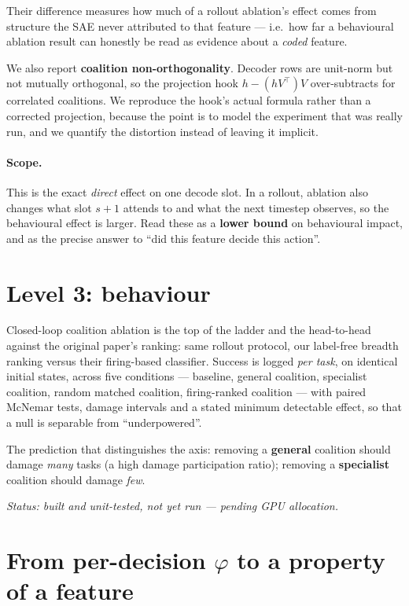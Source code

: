 \documentclass[11pt]{article}
\begin{document}
\noindent
Their difference measures how much of a rollout ablation's effect comes from structure the SAE
never attributed to that feature --- i.e.\ how far a behavioural ablation result can honestly
be read as evidence about a \emph{coded} feature.

We also report \textbf{coalition non-orthogonality}. Decoder rows are unit-norm but not
mutually orthogonal, so the projection hook $h - (hV^{\!\top})V$ over-subtracts for correlated
coalitions. We reproduce the hook's actual formula rather than a corrected projection, because
the point is to model the experiment that was really run, and we quantify the distortion
instead of leaving it implicit.

\paragraph{Scope.} This is the exact \emph{direct} effect on one decode slot. In a rollout,
ablation also changes what slot $s{+}1$ attends to and what the next timestep observes, so the
behavioural effect is larger. Read these as a \textbf{lower bound} on behavioural impact, and
as the precise answer to ``did this feature decide this action''.

\section{Level 3: behaviour}
\label{sec:behaviour}

Closed-loop coalition ablation is the top of the ladder and the head-to-head against the
original paper's ranking: same rollout protocol, our label-free breadth ranking versus their
firing-based classifier. Success is logged \emph{per task}, on identical initial states, across
five conditions --- baseline, general coalition, specialist coalition, random matched
coalition, firing-ranked coalition --- with paired McNemar tests, damage intervals and a stated
minimum detectable effect, so that a null is separable from ``underpowered''.

The prediction that distinguishes the axis: removing a \textbf{general} coalition should damage
\emph{many} tasks (a high damage participation ratio); removing a \textbf{specialist} coalition
should damage \emph{few}.

\emph{Status: built and unit-tested, not yet run --- pending GPU allocation.}

\section{From per-decision \texorpdfstring{$\varphi$}{phi} to a property of a feature}
\label{sec:aggregation}
\end{document}
